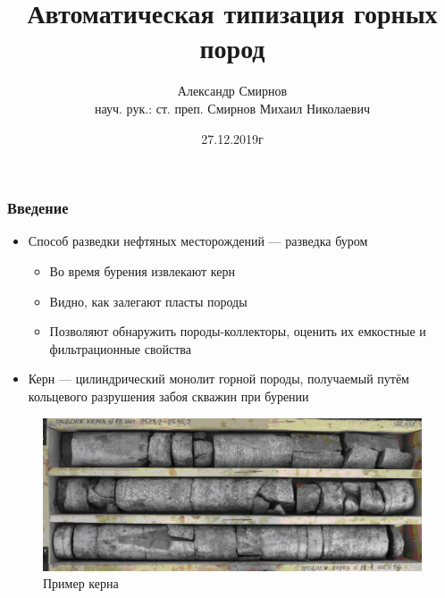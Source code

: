 \documentclass[xetex,mathserif,serif]{beamer}
\title{Автоматическая типизация горных пород}
\author[Александр Смирнов]{Александр Смирнов\\ \footnotesize науч. рук.: ст. преп. Смирнов Михаил Николаевич} %
\date{27.12.2019г}
\begin{document}
	\frame{\titlepage}


	\begin{frame}
		\frametitle{Введение}
		
		\begin{itemize}
	    	\item Способ разведки нефтяных месторождений — разведка буром
        	    \begin{itemize}
        	    	\item Во время бурения извлекают керн
        	    	\item Видно, как залегают пласты породы
        	    	\item Позволяют обнаружить породы-коллекторы, оценить их емкостные и фильтрационные свойства
            	\end{itemize}
            \item Керн — цилиндрический монолит горной породы, получаемый путём кольцевого разрушения забоя скважин при бурении
        \end{itemize}	
        
        \begin{figure}[h]
            \label{керн}
            \centering
            \includegraphics[scale=0.25]{images/kern.jpg}
            \caption{Пример керна}
        \end{figure}
        
	\end{frame}
\end{document}
